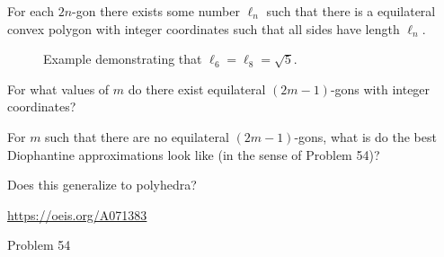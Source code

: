 \documentclass{article}
\begin{document}
For each $2n$-gon there exists some number $\ell_n$ such that there is a
equilateral convex polygon with integer coordinates such that all sides have
length $\ell_n$.
\begin{figure}[ht!]
  \centering
  \hspace{1cm}
  \caption{
    Example demonstrating that $\ell_6 = \ell_8 = \sqrt{5}$.
  }
\end{figure}
\begin{question}
  For what values of $m$ do there exist equilateral $(2m-1)$-gons with integer
  coordinates?
\end{question}

\begin{related}
  \item For $m$ such that there are no equilateral $(2m-1)$-gons, what is do
    the best Diophantine approximations look like (in the sense of
    Problem 54)?
  \item Does this generalize to polyhedra?
\end{related}
\begin{references}
  \item \url{https://oeis.org/A071383}
  \item Problem 54
\end{references}
\end{document}
